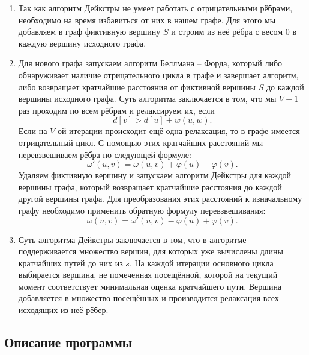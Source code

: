 \documentclass[12pt]{article}
\begin{document}
\begin{enumerate}
    \item Так как алгоритм Дейкстры не умеет работать с отрицательными рёбрами, необходимо на время избавиться от них в нашем графе. Для этого мы добавляем в граф фиктивную вершину \( S \) и строим из неё рёбра с весом \( 0 \) в каждую вершину исходного графа.
    
    \item Для нового графа запускаем алгоритм Беллмана -- Форда, который либо обнаруживает наличие отрицательного цикла в графе и завершает алгоритм, либо возвращает кратчайшие расстояния от фиктивной вершины \( S \) до каждой вершины исходного графа. Суть алгоритма заключается в том, что мы \( V - 1 \) раз проходим по всем рёбрам и релаксируем их, если 
    \[
    d[v] > d[u] + w(u, w).
    \]
    Если на \( V \)-ой итерации происходит ещё одна релаксация, то в графе имеется отрицательный цикл. С помощью этих кратчайших расстояний мы перевзвешиваем рёбра по следующей формуле:
    \[
    \omega'(u, v) = \omega(u, v) + \varphi(u) - \varphi(v).
    \]
    Удаляем фиктивную вершину и запускаем алгоритм Дейкстры для каждой вершины графа, который возвращает кратчайшие расстояния до каждой другой вершины графа. Для преобразования этих расстояний к изначальному графу необходимо применить обратную формулу перевзвешивания:
    \[
    \omega(u, v) = \omega'(u, v) - \varphi(u) + \varphi(v).
    \]
    
    \item Суть алгоритма Дейкстры заключается в том, что в алгоритме поддерживается множество вершин, для которых уже вычислены длины кратчайших путей до них из \( s \). На каждой итерации основного цикла выбирается вершина, не помеченная посещённой, которой на текущий момент соответствует минимальная оценка кратчайшего пути. Вершина добавляется в множество посещённых и производится релаксация всех исходящих из неё рёбер.
\end{enumerate}

\subsection*{Описание программы}
\end{document}
